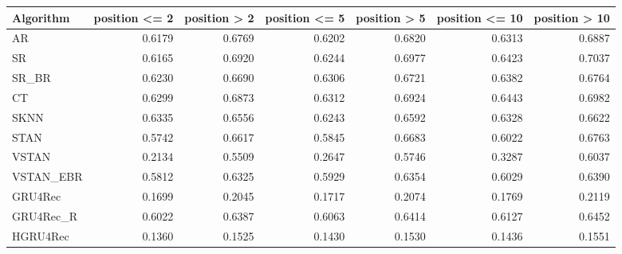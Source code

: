 \begin{tabular}{lrrrrrr}
\toprule
 Algorithm &  position <= 2 &  position > 2 &  position <= 5 &  position > 5 &  position <= 10 &  position > 10 \\
\midrule
        AR &         0.6179 &        0.6769 &         0.6202 &        0.6820 &          0.6313 &         0.6887 \\
        SR &         0.6165 &        0.6920 &         0.6244 &        0.6977 &          0.6423 &         0.7037 \\
     SR\_BR &         0.6230 &        0.6690 &         0.6306 &        0.6721 &          0.6382 &         0.6764 \\
        CT &         0.6299 &        0.6873 &         0.6312 &        0.6924 &          0.6443 &         0.6982 \\
      SKNN &         0.6335 &        0.6556 &         0.6243 &        0.6592 &          0.6328 &         0.6622 \\
      STAN &         0.5742 &        0.6617 &         0.5845 &        0.6683 &          0.6022 &         0.6763 \\
     VSTAN &         0.2134 &        0.5509 &         0.2647 &        0.5746 &          0.3287 &         0.6037 \\
 VSTAN\_EBR &         0.5812 &        0.6325 &         0.5929 &        0.6354 &          0.6029 &         0.6390 \\
   GRU4Rec &         0.1699 &        0.2045 &         0.1717 &        0.2074 &          0.1769 &         0.2119 \\
 GRU4Rec\_R &         0.6022 &        0.6387 &         0.6063 &        0.6414 &          0.6127 &         0.6452 \\
  HGRU4Rec &         0.1360 &        0.1525 &         0.1430 &        0.1530 &          0.1436 &         0.1551 \\
\bottomrule
\end{tabular}
